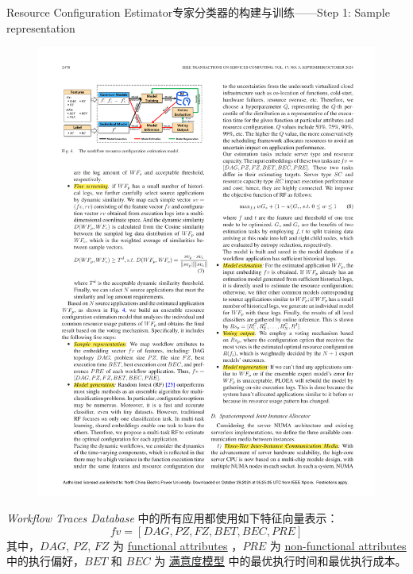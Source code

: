 \documentclass[aspectratio=169]{beamer}
\begin{document}
\begin{frame}{Resource Configuration Estimator}{专家分类器的构建与训练——Step 1: Sample representation}\label{label:sample-representation}
  \begin{figure}
    \centering
    \includegraphics[height=0.4\textheight]{img/method/resource-configuration-estimation-model.pdf}
  \end{figure}
  \textit{Workflow Traces Database} 中的所有应用都使用如下特征向量表示：
  \begin{equation*}
    fv = [DAG, PZ, FZ, BET, BEC, PRE]
  \end{equation*}
  其中，$DAG$, $PZ$, $FZ$ 为 \hyperlink{label:functional-attributes}{\underline{functional attributes}} ，$PRE$ 为 \hyperlink{label:non-functional-attributes}{\underline{non-functional attributes}} 中的执行偏好，$BET$ 和 $BEC$ 为 \hyperlink{label:bet-and-bec}{\underline{满意度模型}} 中的最优执行时间和最优执行成本。
\end{frame}
\end{document}
